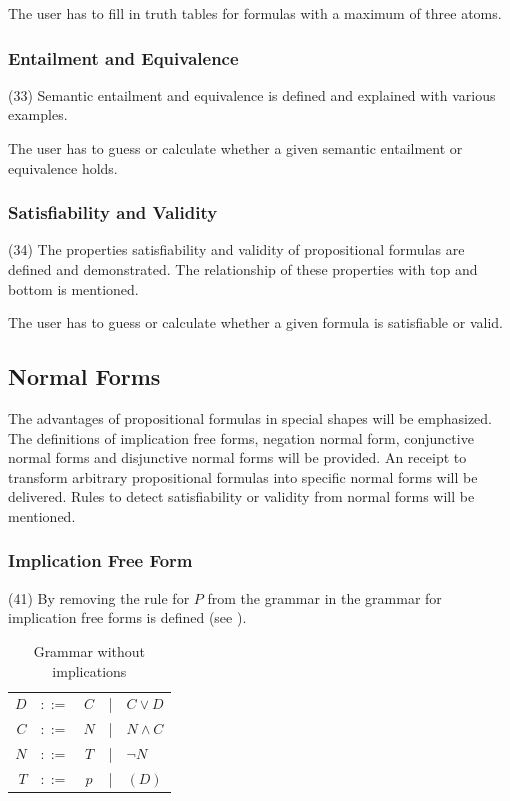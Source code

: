 The user has to fill in truth tables for formulas with a maximum of three atoms.

\subsubsection{Entailment and Equivalence}
\label{tut:33}
(33) Semantic entailment and equivalence is defined and explained with various examples.

The user has to guess or calculate whether a given semantic entailment or equivalence holds. 

\subsubsection{Satisfiability and Validity}
\label{tut:34}
(34) The properties satisfiability and validity of propositional formulas are defined and demonstrated. 
The relationship of these properties with top and bottom is mentioned. 

The user has to guess or calculate whether a given formula is satisfiable or valid.

\subsection{Normal Forms}

The advantages of propositional formulas in special shapes will be emphasized.
The definitions of implication free forms, negation normal form, 
conjunctive normal forms and disjunctive normal forms will be provided. 
An receipt to transform arbitrary propositional formulas into specific normal forms will be delivered.
Rules to detect satisfiability or validity from normal forms will be mentioned.

\subsubsection{Implication Free Form}
\label{tut:41}
(41)
By removing the rule for $P$ from the grammar in  
the grammar for implication free forms is defined  
(see ). 

\begin{table}[htdp]
\begin{center}
\begin{tabular}{rcccl}
$D$		&$::=$ & $C$ &|& $C \vee D$			\\
$C$		&$::=$ & $N$ &|& $N \wedge C$ 		\\
$N$		&$::=$ & $T$ &|& $\neg N$ 			\\
$T$		&$::=$ & $p$ &|& $(D)$
\end{tabular}
\caption{Grammar without implications}
\label{tab:BNFGRIFF}
\end{center}
\end{table}


